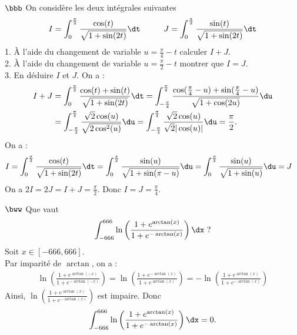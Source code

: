 \documentclass[11pt]{article}
\begin{document}
\begin{exercice}{$\bbb$}{}
    On considère les deux intégrales suivantes
    \begin{equation*}
        I=\int_0^{\frac{\pi}{2}}{\frac{\cos(t)}{\sqrt{1+\sin(2t)}}\dt} \hspace{1cm} J=\int_0^{\frac{\pi}{2}}{\frac{\sin(t)}{\sqrt{1+\sin(2t)}}\dt}
    \end{equation*}
    1. À l'aide du changement de variable $u=\frac{\pi}{4}-t$ calculer $I+J$.\\
    2. À l'aide du changement de variable $u=\frac{\pi}{2}-t$ montrer que $I=J$.\\
    3. En déduire $I$ et $J$.
    \tcblower
     On a :
    \begin{align*}
        I + J &= \int_0^{\frac{\pi}{2}}{\frac{\cos(t) + \sin(t)}{\sqrt{1+\sin(2t)}}\dt}=\int_{-\frac{\pi}{4}}^{\frac{\pi}{4}}{\frac{\cos(\frac{\pi}{4}-u)+\sin(\frac{\pi}{4}-u)}{\sqrt{1+\cos(2u)}}\du}\\
        &=\int_{-\frac{\pi}{4}}^{\frac{\pi}{4}}{\frac{\sqrt{2}\cos(u)}{\sqrt{2\cos^2(u)}}\du}=\int_{-\frac{\pi}{4}}^{\frac{\pi}{4}}{\frac{\sqrt{2}\cos(u)}{\sqrt{2}|\cos(u)|}\du}=\frac{\pi}{2}.
    \end{align*}
     On a :
    \begin{align*}
        I &= \int_0^{\frac{\pi}{2}}{\frac{\cos(t)}{\sqrt{1+\sin(2t)}}\dt}=\int_0^{\frac{\pi}{2}}{\frac{\sin(u)}{\sqrt{1+\sin(\pi-u)}}\du}=\int_0^{\frac{\pi}{2}}{\frac{\sin(u)}{\sqrt{1+\sin(u)}}\du}=J
    \end{align*}
     On a $2I = 2J = I+J = \frac{\pi}{2}$. Donc $I = J = \frac{\pi}{4}$.
\end{exercice}

\begin{exercice}{$\bww$}{}
    Que vaut
    \begin{equation*}
        \int_{-666}^{666}{\ln\left(\frac{1+e^{\arctan(x)}}{1+e^{-\arctan(x)}}\right)\dx} \text{ ?}
    \end{equation*}
    \tcblower
    Soit $x\in[-666,666]$.\\
    Par imparité de $\arctan$, on a :
    \begin{align*}
        \ln\left(\frac{1+e^{\arctan(-x)}}{1+e^{-\arctan(-x)}}\right)=\ln\left(\frac{1+e^{-\arctan(x)}}{1+e^{\arctan(x)}}\right)=-\ln\left(\frac{1+e^{\arctan(x)}}{1+e^{-\arctan(x)}}\right)
    \end{align*}
    Ainsi, $\ln\left(\frac{1+e^{\arctan(x)}}{1+e^{-\arctan(x)}}\right)$ est impaire. Donc 
    \begin{equation*}
        \int_{-666}^{666}{\ln\left(\frac{1+e^{\arctan(x)}}{1+e^{-\arctan(x)}}\right)\dx}=0.
    \end{equation*}
\end{exercice}
\end{document}
